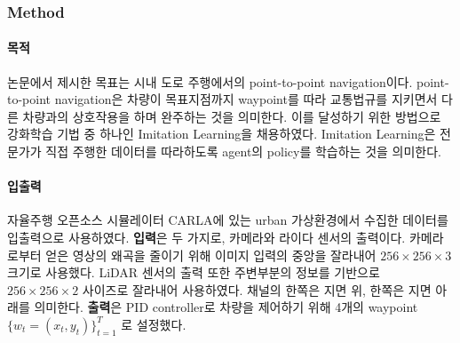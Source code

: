 \subsubsection{Method}{\label{subsubsec:tf_method}}
\paragraph*{목적} 논문에서 제시한 목표는 시내 도로 주행에서의 point-to-point navigation이다.
point-to-point navigation은 차량이 목표지점까지
waypoint를 따라
교통법규를 지키면서
다른 차량과의 상호작용을 하며
완주하는 것을 의미한다.
이를 달성하기 위한 방법으로 강화학습 기법 중 하나인 Imitation Learning을 채용하였다.
Imitation Learning은 전문가가 직접 주행한 데이터를 따라하도록 agent의 policy를 학습하는 것을 의미한다.

\paragraph*{입출력} 자율주행 오픈소스 시뮬레이터 CARLA\cite{CARLA}에 있는 urban 가상환경에서 수집한 데이터를 입출력으로 사용하였다.
\textbf{입력}은 두 가지로, 카메라와 라이다 센서의 출력이다.
카메라로부터 얻은 영상의 왜곡을 줄이기 위해 이미지 입력의 중앙을 잘라내어 $256 \times 256 \times 3$  크기로 사용했다.
LiDAR 센서의 출력 또한 주변부분의 정보를 기반으로 $256 \times 256 \times 2$ 사이즈로 잘라내어 사용하였다.
채널의 한쪽은 지면 위, 한쪽은 지면 아래를 의미한다.
\textbf{출력}은 PID controller로 차량을 제어하기 위해 4개의 waypoint $\{w_t = (x_t, y_t)\}_{t=1}^T$ 로 설정했다.

